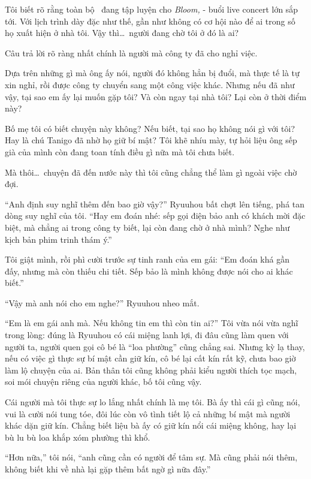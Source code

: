 \documentclass[../main.tex]{subfiles}
\begin{document}
Tôi biết rõ rằng toàn bộ \hll\ đang tập luyện cho \textit{Bloom,} - buổi live concert lớn sắp tới. Với lịch trình dày đặc như thế, gần như không có cơ hội nào để ai trong số họ xuất hiện ở nhà tôi. Vậy thì\dots\ người đang chờ tôi ở đó là ai?

Câu trả lời rõ ràng nhất chính là người mà công ty đã cho nghỉ việc.

Dựa trên những gì mà ông ấy nói, người đó không hẳn bị đuổi, mà thực tế là tự xin nghỉ, rồi được công ty chuyển sang một công việc khác. Nhưng nếu đã như vậy, tại sao em ấy lại muốn gặp tôi? Và còn ngay tại nhà tôi? Lại còn ở thời điểm này?

Bố mẹ tôi có biết chuyện này không? Nếu biết, tại sao họ không nói gì với tôi? Hay là chú Tanigo đã nhờ họ giữ bí mật? Tôi khẽ nhíu mày, tự hỏi liệu ông sếp già của mình còn đang toan tính điều gì nữa mà tôi chưa biết.

Mà thôi\dots\ chuyện đã đến nước này thì tôi cũng chẳng thể làm gì ngoài việc chờ đợi.

``Anh định suy nghĩ thêm đến bao giờ vậy?'' Ryuuhou bất chợt lên tiếng, phá tan dòng suy nghĩ của tôi. ``Hay em đoán nhé: sếp gọi điện bảo anh có khách mời đặc biệt, mà chẳng ai trong công ty biết, lại còn đang chờ ở nhà mình? Nghe như kịch bản phim trinh thám ý.''

Tôi giật mình, rồi phì cười trước sự tinh ranh của em gái: ``Em đoán khá gần đấy, nhưng mà còn thiếu chi tiết. Sếp bảo là mình không được nói cho ai khác biết.''

``Vậy mà anh nói cho em nghe?'' Ryuuhou nheo mắt.

``Em là em gái anh mà. Nếu không tin em thì còn tin ai?'' Tôi vừa nói vừa nghĩ trong lòng: đúng là Ryuuhou có cái miệng lanh lợi, đi đâu cũng làm quen với người ta, người quen gọi cô bé là ``loa phường'' cũng chẳng sai. Nhưng kỳ lạ thay, nếu có việc gì thực sự bí mật cần giữ kín, cô bé lại cất kín rất kỹ, chưa bao giờ làm lộ chuyện của ai. Bản thân tôi cũng không phải kiểu người thích tọc mạch, soi mói chuyện riêng của người khác, bố tôi cũng vậy.

Cái người mà tôi thực sự lo lắng nhất chính là mẹ tôi. Bà ấy thì cái gì cũng nói, vui là cười nói tung tóe, đôi lúc còn vô tình tiết lộ cả những bí mật mà người khác dặn giữ kín. Chẳng biết liệu bà ấy có giữ kín nổi cái miệng không, hay lại bù lu bù loa khắp xóm phường thì khổ.

``Hơn nữa,'' tôi nói, ``anh cũng cần có người để tâm sự. Mà cũng phải nói thêm, không biết khi về nhà lại gặp thêm bất ngờ gì nữa đây.''
\end{document}
